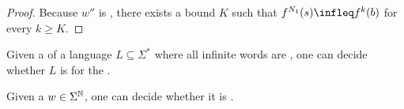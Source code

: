 \begin{proof}
  Because $w''$ is , there exists a bound $K$ such that
  $f^{N_1}(s) \infleq f^k(b)$ for every $k \geq K$.

\end{proof}

\begin{corollary}
    \label{morphic-wqo:cor}
    Given a  of a language $L \subseteq
    \Sigma^*$ where all infinite words are , one can
    decide whether $L$ is  for the .
\end{corollary} 



\begin{conjecture}
  \label{morphic-uur:conj}
    Given a  $w \in \Sigma^{\mathbb{N}}$, one can decide
    whether it is .
\end{conjecture}
